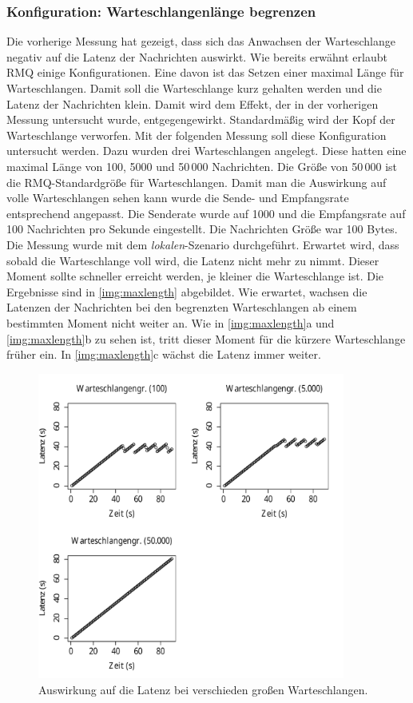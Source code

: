 \subsubsection{Konfiguration: Warteschlangenlänge begrenzen}
\label{sec:maxlength}
Die vorherige Messung hat gezeigt, dass sich das Anwachsen der Warteschlange negativ auf die Latenz der Nachrichten auswirkt. Wie bereits erwähnt erlaubt RMQ einige Konfigurationen. Eine davon ist das Setzen einer maximal Länge für Warteschlangen. Damit soll die Warteschlange kurz gehalten werden und die Latenz der Nachrichten klein. Damit wird dem Effekt, der in der vorherigen Messung untersucht wurde, entgegengewirkt. Standardmäßig wird der Kopf der Warteschlange verworfen. Mit der folgenden Messung soll diese Konfiguration untersucht werden. Dazu wurden drei Warteschlangen angelegt. Diese hatten eine maximal Länge von 100, 5000 und 50\,000 Nachrichten. Die Größe von 50\,000 ist die RMQ-Standardgröße für Warteschlangen. Damit man die Auswirkung auf volle Warteschlangen sehen kann wurde die Sende- und Empfangsrate entsprechend angepasst. Die Senderate wurde auf 1000 und die Empfangsrate auf 100 Nachrichten pro Sekunde eingestellt. Die Nachrichten Größe war 100 Bytes. Die Messung wurde mit dem \textit{lokalen}-Szenario durchgeführt. Erwartet wird, dass sobald die Warteschlange voll wird, die Latenz nicht mehr zu nimmt. Dieser Moment sollte schneller erreicht werden, je kleiner die Warteschlange ist.
Die Ergebnisse sind in \autoref{img:maxlength} abgebildet. Wie erwartet, wachsen die Latenzen der Nachrichten bei den begrenzten Warteschlangen ab einem bestimmten Moment nicht weiter an. Wie in \autoref{img:maxlength}a und \autoref{img:maxlength}b zu sehen ist, tritt dieser Moment für die kürzere Warteschlange früher ein. In \autoref{img:maxlength}c wächst die Latenz immer weiter.
\begin{figure}[t]
\center
  \includegraphics[width=0.9\textwidth]{images/measurement/max-length.pdf}
  \caption{Auswirkung auf die Latenz bei verschieden großen Warteschlangen.}
  \label{img:maxlength}
\end{figure}
